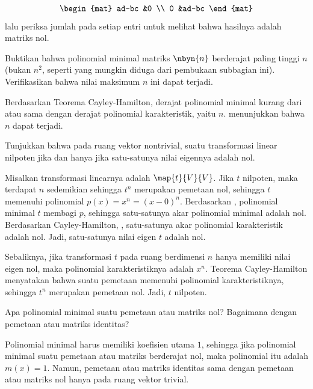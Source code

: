 \begin{exercises}
\begin{answer}
\begin{multline*}
\begin{mat}
            ad-bc  &0      \\
            0      &ad-bc
         \end{mat}
      \end{multline*}
      lalu periksa jumlah pada setiap entri untuk melihat bahwa hasilnya adalah matriks nol.
    \end{answer}
  \recommended \item
    Buktikan bahwa polinomial minimal matriks \( \nbyn{n} \) berderajat
    paling tinggi \( n \) (bukan \( n^2 \), seperti yang mungkin diduga dari
    pembukaan subbagian ini).
    Verifikasikan bahwa nilai maksimum \( n \) ini dapat terjadi.
    \begin{answer}
      Berdasarkan Teorema Cayley-Hamilton, derajat polinomial minimal
      kurang dari atau sama dengan derajat polinomial karakteristik, yaitu
      \( n \).
       menunjukkan bahwa \( n \) dapat terjadi.
    \end{answer}
   \recommended \item 
     Tunjukkan bahwa pada ruang vektor nontrivial, suatu transformasi linear
     nilpoten jika dan hanya jika satu-satunya nilai eigennya adalah nol.
     \begin{answer}
       Misalkan transformasi linearnya adalah $\map{t}{V}{V}$.
       Jika $t$ nilpoten, maka terdapat $n$ sedemikian sehingga $t^n$ merupakan pemetaan nol,
       sehingga $t$ memenuhi polinomial $p(x)=x^n=(x-0)^n$.
       Berdasarkan , polinomial minimal
       $t$ membagi $p$, sehingga satu-satunya akar polinomial minimal adalah nol.
       Berdasarkan Cayley-Hamilton, ,
       satu-satunya akar polinomial karakteristik adalah nol.
       Jadi, satu-satunya nilai eigen $t$ adalah nol.

       Sebaliknya, jika transformasi \( t \) pada ruang berdimensi
       \( n \) hanya memiliki nilai eigen nol,
       maka polinomial karakteristiknya adalah \( x^n \).
       Teorema Cayley-Hamilton menyatakan bahwa suatu pemetaan memenuhi
       polinomial karakteristiknya, sehingga \( t^n \) merupakan pemetaan nol.
       Jadi, $t$ nilpoten.
     \end{answer}
   \item 
       Apa polinomial minimal suatu pemetaan atau matriks nol?
       Bagaimana dengan pemetaan atau matriks identitas?
       \begin{answer}
         Polinomial minimal harus memiliki koefisien utama $1$,
         sehingga jika polinomial minimal suatu pemetaan atau matriks
         berderajat nol, maka polinomial itu adalah $m(x)=1$.
         Namun, pemetaan atau matriks identitas sama dengan pemetaan atau matriks nol
         hanya pada ruang vektor trivial.


\end{answer}
\end{exercises}
